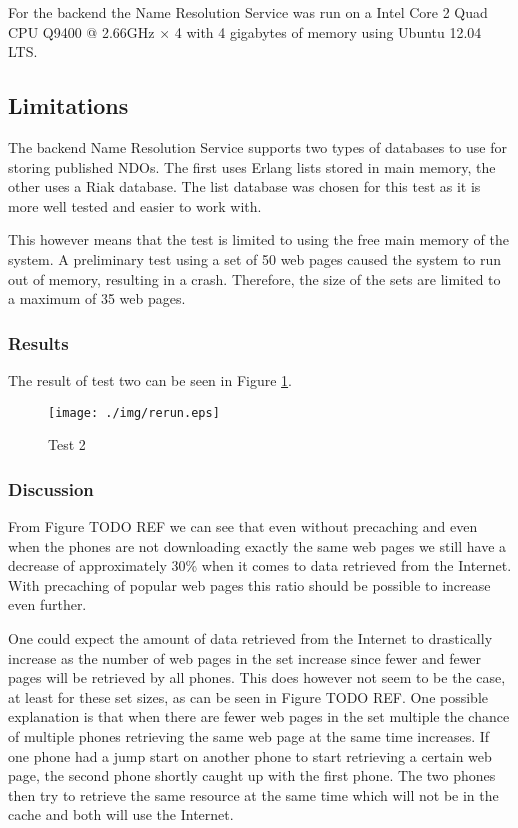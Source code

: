 For the backend the Name Resolution Service was run on a Intel Core 2 Quad CPU Q9400 @ 2.66GHz × 4 with 4 gigabytes of memory using Ubuntu 12.04 LTS.

\subsection{Limitations}

The backend Name Resolution Service supports two types of databases to use for storing published NDOs. The first uses Erlang lists stored in main memory, the other uses a Riak database. The list database was chosen for this test as it is more well tested and easier to work with.

This however means that the test is limited to using the free main memory of the system. A preliminary test using a set of 50 web pages caused the system to run out of memory, resulting in a crash. Therefore, the size of the sets are limited to a maximum of 35 web pages.

\subsubsection{Results}




The result of test two can be seen in Figure \ref{fig:frontendtest2}.

\begin{figure}
	\centering
		\texttt{[image: ./img/rerun.eps]}
    	\caption{Test 2}
	\label{fig:frontendtest2}
\end{figure}

\subsubsection{Discussion}

From Figure TODO REF we can see that even without precaching and even when the phones are not downloading exactly the same web pages we still have a decrease of approximately 30\% when it comes to data retrieved from the Internet. With precaching of popular web pages this ratio should be possible to increase even further.

One could expect the amount of data retrieved from the Internet to drastically increase as the number of web pages in the set increase since fewer and fewer pages will be retrieved by all phones. This does however not seem to be the case, at least for these set sizes, as can be seen in Figure TODO REF. One possible explanation is that when there are fewer web pages in the set multiple the chance of multiple phones retrieving the same web page at the same time increases. If one phone had a jump start on another phone to start retrieving a certain web page, the second phone shortly caught up with the first phone. The two phones then try to retrieve the same resource at the same time which will not be in the cache and both will use the Internet.

